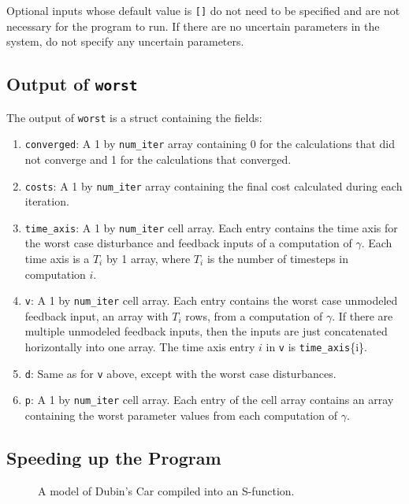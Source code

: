 \documentclass{article}
\begin{document}
Optional inputs whose default value is \texttt{[]} do not need to be specified
and are not necessary for the program to run. If there are no uncertain
parameters in the system, do not specify any uncertain parameters.


\subsection{Output of \texttt{worst}}
The output of \texttt{worst} is a struct containing the fields:
\begin{enumerate}
\item \texttt{converged}: A 1 by \texttt{num\_iter} array containing 0 for the
calculations that did not converge and 1 for the calculations that converged.

\item \texttt{costs}: A 1 by \texttt{num\_iter} array containing the final cost
calculated during each iteration.

\item \texttt{time\_axis}: A 1 by \texttt{num\_iter} cell array. Each entry
contains the time axis for the worst case disturbance and feedback inputs of a
computation of $\gamma$. Each time axis is a $T_i$ by 1 array, where $T_i$ is
the number of timesteps in computation $i$.

\item \texttt{v}: A 1 by \texttt{num\_iter} cell array. Each entry contains the
worst case unmodeled feedback input, an array with $T_i$ rows, from a
computation of $\gamma$. If there are multiple unmodeled feedback inputs, then
the inputs are just concatenated horizontally into one array. The time axis
entry $i$ in \texttt{v} is \texttt{time\_axis}\{i\}.

\item \texttt{d}: Same as for \texttt{v} above, except with the worst case
disturbances.

\item \texttt{p}: A 1 by \texttt{num\_iter} cell array. Each entry of the cell
array contains an array containing the worst parameter values from each
computation of $\gamma$.
\end{enumerate}


\subsection{Speeding up the Program}

\begin{figure}
\begin{center}
\caption{A model of Dubin's Car compiled into an S-function.}
\end{center}
\label{sfunc}
\end{figure}
\end{document}
